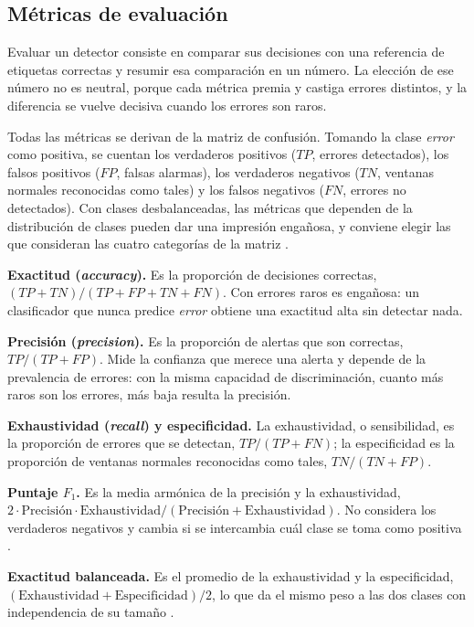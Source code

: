 \subsection{Métricas de evaluación}\label{sec:mt_metricas}

Evaluar un detector consiste en comparar sus decisiones con una referencia de etiquetas correctas y resumir esa comparación en un número. La elección de ese número no es neutral, porque cada métrica premia y castiga errores distintos, y la diferencia se vuelve decisiva cuando los errores son raros.

Todas las métricas se derivan de la matriz de confusión. Tomando la clase \emph{error} como positiva, se cuentan los verdaderos positivos ($TP$, errores detectados), los falsos positivos ($FP$, falsas alarmas), los verdaderos negativos ($TN$, ventanas normales reconocidas como tales) y los falsos negativos ($FN$, errores no detectados). Con clases desbalanceadas, las métricas que dependen de la distribución de clases pueden dar una impresión engañosa, y conviene elegir las que consideran las cuatro categorías de la matriz \cite{diallo2025_metrics}.

\textbf{Exactitud (\textit{accuracy}).} Es la proporción de decisiones correctas, $(TP + TN)/(TP + FP + TN + FN)$. Con errores raros es engañosa: un clasificador que nunca predice \emph{error} obtiene una exactitud alta sin detectar nada.

\textbf{Precisión (\textit{precision}).} Es la proporción de alertas que son correctas, $TP/(TP + FP)$. Mide la confianza que merece una alerta y depende de la prevalencia de errores: con la misma capacidad de discriminación, cuanto más raros son los errores, más baja resulta la precisión.

\textbf{Exhaustividad (\textit{recall}) y especificidad.} La exhaustividad, o sensibilidad, es la proporción de errores que se detectan, $TP/(TP + FN)$; la especificidad es la proporción de ventanas normales reconocidas como tales, $TN/(TN + FP)$.

\textbf{Puntaje $F_1$.} Es la media armónica de la precisión y la exhaustividad, $2 \cdot \mathrm{Precisión} \cdot \mathrm{Exhaustividad} / (\mathrm{Precisión} + \mathrm{Exhaustividad})$. No considera los verdaderos negativos y cambia si se intercambia cuál clase se toma como positiva \cite{chicco2020_mcc}.

\textbf{Exactitud balanceada.} Es el promedio de la exhaustividad y la especificidad, $(\mathrm{Exhaustividad} + \mathrm{Especificidad})/2$, lo que da el mismo peso a las dos clases con independencia de su tamaño \cite{diallo2025_metrics}.

